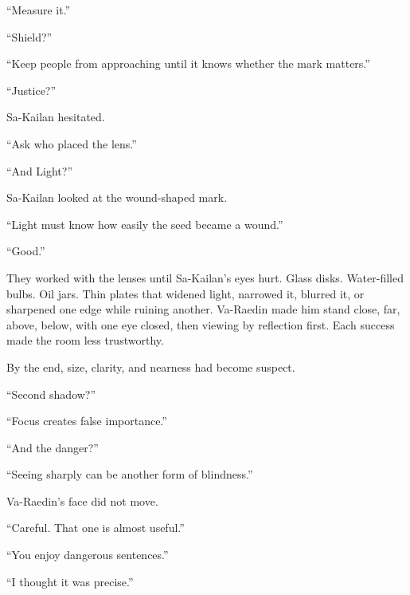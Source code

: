 “Measure it.”\par

“Shield?”\par

“Keep people from approaching until it knows whether the mark matters.”\par

“Justice?”\par

Sa-Kailan hesitated.\par

“Ask who placed the lens.”\par

“And Light?”\par

Sa-Kailan looked at the wound-shaped mark.\par

“Light must know how easily the seed became a wound.”\par

“Good.”\par

They worked with the lenses until Sa-Kailan’s eyes hurt.
Glass disks.
Water-filled bulbs.
Oil jars.
Thin plates that widened light, narrowed it, blurred it, or sharpened one edge while ruining another.
Va-Raedin made him stand close, far, above, below, with one eye closed, then viewing by reflection first.
Each success made the room less trustworthy.\par

By the end, size, clarity, and nearness had become suspect.\par

“Second shadow?”\par

“Focus creates false importance.”\par

“And the danger?”\par

“Seeing sharply can be another form of blindness.”\par

Va-Raedin’s face did not move.\par

“Careful.
That one is almost useful.”\par

“You enjoy dangerous sentences.”\par

“I thought it was precise.”\par

